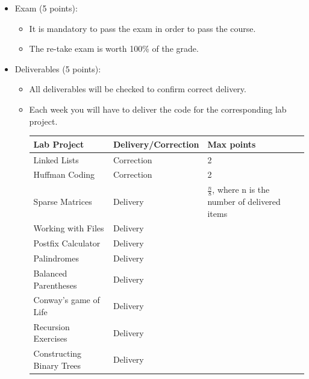 \documentclass[spanish,12pt,a4paper]{article}
\begin{document}
\begin{itemize}
\item Exam (5 points):
\begin{itemize}
\item It is mandatory to pass the exam in order to pass the course.
\item The re-take exam is worth 100\% of the grade. 
\end{itemize}
\item Deliverables (5 points):
\begin{itemize}
\item All deliverables will be checked to confirm correct delivery.
\item Each week you will have to deliver the code for the corresponding lab project.
\\
\vspace{-0.5cm}
\begin{table}[h!btp]
\renewcommand{\arraystretch}{1.2}
\centering
\begin{tabular}{m{}@{\hskip 0.05\textwidth}m{}m{}}
\toprule
\textbf{Lab Project} & \textbf{Delivery/Correction} & \textbf{Max points} \\
\midrule
Linked Lists & Correction & 2 \\
Huffman Coding & Correction & 2 \\
\midrule
Sparse Matrices & Delivery & \multirowcell{8}{{\Huge $\frac{n}{8}$}, where n is \\the number of \\delivered items} \\
Working with Files & Delivery &  \\
Postfix Calculator & Delivery  &  \\
Palindromes & Delivery &  \\
Balanced Parentheses & Delivery &  \\
Conway's game of Life & Delivery & \\
Recursion Exercises & Delivery &  \\
Constructing Binary Trees & Delivery &  \\
\bottomrule
\end{tabular}
\end{table}
\end{itemize}
\end{itemize}
\end{document}
